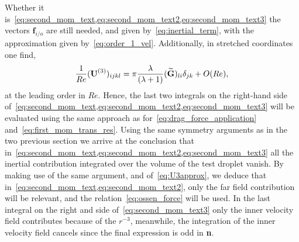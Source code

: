 Whether it is~\ref{eq:second_mom_text,eq:second_mom_text2,eq:second_mom_text3} the vectors $\textbf{f}_{i/o}$ are still needed, and given by~\ref{eq:inertial_term}, with the approximation given by~\ref{eq:order_1_vel}. 
Additionally, in stretched coordinates one find, 
\begin{equation}
    \frac{1}{Re}(\textbf{U}^{(3)})_{ijkl} =  \pi \frac{\lambda}{(\lambda+1)}(\wt{\textbf{G}})_{l i}\delta_{jk} + O(Re), 
    \label{eq:U3approx}
\end{equation}
at the leading order in $Re$. 
Hence, the last two integrals on the right-hand side of~\ref{eq:second_mom_text,eq:second_mom_text2,eq:second_mom_text3} will be evaluated using the same approach as for~\ref{eq:drag_force_application} and~\ref{eq:first_mom_trans_res}. 
Using the same symmetry arguments as in the two previous section we arrive at the conclusion that in~\ref{eq:second_mom_text,eq:second_mom_text2,eq:second_mom_text3} all the inertial contribution integrated over the volume of the test droplet vanish. 
By making use of the same argument, and of~\ref{eq:U3approx}, we deduce that in~\ref{eq:second_mom_text,eq:second_mom_text2}, only the far field contribution will be relevant, and the relation~\ref{eq:ossen_force} will be used. 
In the last integral on the right and side of~\ref{eq:second_mom_text3} only the inner velocity field contributes because of the $r^{-3}$, meanwhile, the integration of the inner velocity field cancels since the final expression is odd in \textbf{n}.

